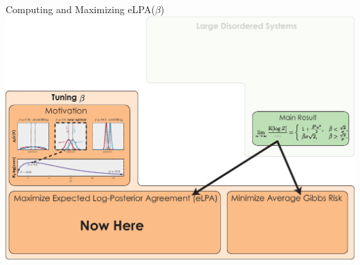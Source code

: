 \documentclass[presentation,12pt]{beamer}
\newcommand{\setroadmapfootline}{%
\setfootline{%
  \textcolor{gray!60}{%
    \tiny\insertshortdate \hfill \insertshortauthor \quad 
    \phantom{\insertframenumber/\inserttotalframenumber}
  }%
}%
}
\begin{document}
{\setroadmapfootline \begin{frame}[noframenumbering]{Computing and Maximizing eLPA($\beta$)}
\centering
\includegraphics[width=\textwidth]{roadmap_after_elpa_motivation} 
\end{frame}}
\end{document}
